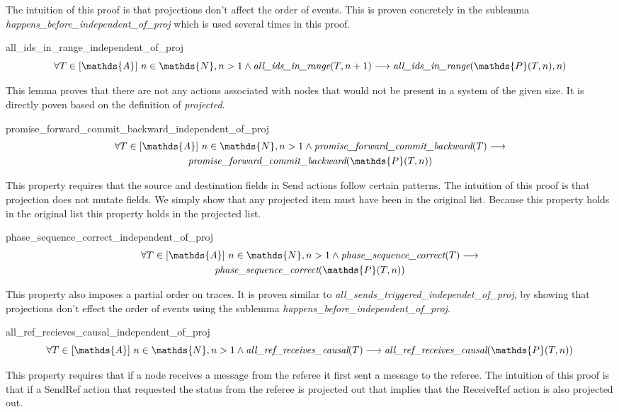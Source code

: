 \documentclass[runningheads]{llncs}
\newcommand{\action}{\mathds{A}}
\newcommand{\listaction}{[\action]}
\newcommand{\projectsize}[2]{\mathds{P}(#1, #2)}
\newcommand{\allir}[2]{\emph{all\_ids\_in\_range}(#1, #2)}
\newcommand{\pfcb}[1]{\emph{promise\_forward\_commit\_backward}(#1)}
\newcommand{\psc}[1]{\emph{phase\_sequence\_correct}(#1)}
\newcommand{\allrrc}[1]{\emph{all\_ref\_receives\_causal}(#1)}
\begin{document}
The intuition of this proof is that projections don't affect the order of events. This is proven concretely in the sublemma \emph{happens\_before\_independent\_of\_proj} which is used several times in this proof. 

\begin{lemma}{all\_ids\_in\_range\_independent\_of\_proj}
$$ \forall T \in \listaction\ n \in \mathds{N}, n > 1 \wedge \allir{T}{n+1} \longrightarrow \allir{\projectsize{T}{n}}{n} $$
\end{lemma}
This lemma proves that there are not any actions associated with nodes that would not be present in a system of the given size. It is directly poven based on the definition of \emph{projected}. 

\begin{lemma}{promise\_forward\_commit\_backward\_independent\_of\_proj}
\begin{multline*}
\forall T \in \listaction\ n \in \mathds{N}, n > 1 \wedge \pfcb{T} \longrightarrow \\
\pfcb{\projectsize{T}{n}} 
\end{multline*}
\end{lemma}
This property requires that the source and destination fields in Send actions follow certain patterns. The intuition of this proof is that projection does not mutate fields. We simply show that any projected item must have been in the original list. Because this property holds in the original list this property holds in the projected list.

\begin{lemma}{phase\_sequence\_correct\_independent\_of\_proj}
\begin{multline*}
\forall T \in \listaction\ n \in \mathds{N}, n > 1 \wedge \psc{T} \longrightarrow \\
\psc{\projectsize{T}{n}}
\end{multline*}
\end{lemma}
This property also imposes a partial order on traces. It is proven similar to \emph{all\_sends\_triggered\_independet\_of\_proj}, by showing that projections don't effect the order of events using the sublemma \emph{happens\_before\_independent\_of\_proj}. 

\begin{lemma}{all\_ref\_recieves\_causal\_independent\_of\_proj}
$$ \forall T \in \listaction\ n \in \mathds{N}, n > 1 \wedge \allrrc{T} \longrightarrow \allrrc{\projectsize{T}{n}} $$
\end{lemma}
This property requires that if a node receives a message from the referee it first sent a message to the referee. The intuition of this proof is that if a SendRef action that requested the status from the referee is projected out that implies that the ReceiveRef action is also projected out.
\end{document}
